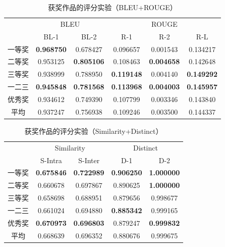 \begin{table}[ht]
  \centering
  \caption{获奖作品的评分实验（BLEU+ROUGE）}
  \label{tab:test_scoring_prized_dsr1_1}
  \begin{tabular}{cccccc}
      \toprule
      &  \multicolumn{2}{c}{BLEU} & \multicolumn{3}{c}{ROUGE}\\
      \cmidrule(r){2-3} \cmidrule(l){4-6}
       & BL-1& BL-2& R-1& R-2& R-L\\
      \midrule
      一等奖	&	\textbf{0.968750} 	&	0.678427 	&	0.096657 	&	0.001543 	&	0.134217 	\\
      二等奖	&	0.953125 	&	\textbf{0.805106} 	&	0.108463 	&	\textbf{0.004658} 	&	0.142648 	\\
      三等奖	&	0.938999 	&	0.788950 	&	\textbf{0.119148} 	&	0.004140 	&	\textbf{0.149292} 	\\
      \cmidrule{2-6} %
      一二三	&	\textbf{0.945848} 	&	\textbf{0.781568} 	&	\textbf{0.113968} 	&	\textbf{0.004003} 	&	\textbf{0.145957} 	\\
      优秀奖	&	0.934612 	&	0.749390 	&	0.107799 	&	0.003346 	&	0.143840 	\\
      \cmidrule{2-6} %
      平均	&	0.937247 	&	0.756938 	&	0.109246 	&	0.003500 	&	0.144337 	\\
      \bottomrule
  \end{tabular}
\end{table}

\begin{table}[ht]
  \centering
  \caption{获奖作品的评分实验（Similarity+Distinct）}
  \label{tab:test_scoring_prized_dsr1_2}
  \begin{tabular}{ccccc}
      \toprule
      & \multicolumn{2}{c}{Similarity} & \multicolumn{2}{c}{Distinct}\\
      \cmidrule(r){2-3} \cmidrule(l){4-5} 
      & S-Intra& S-Inter& D-1& D-2\\
      \midrule
      一等奖&	\bf{0.675846} 	&	\bf{0.722989} 	&	\bf{0.906250} 	&	\bf{1.000000} 	\\
      二等奖&	0.660678 	&	0.697867 	&	0.890625 	&	\bf{1.000000} \\
      三等奖&	0.658698 	&	0.688951 	&	0.879656 	&	0.998677 	\\
      \cmidrule{2-5} %
      一二三&	0.661024 	&	0.694880 	&	\bf{0.885342} 	&	0.999165 \\
      优秀奖&	\bf{0.670973} 	&	\bf{0.696803} 	&	0.879247 	&	\bf{0.999832} 	\\
      
      \cmidrule{2-5} %
      平均&	0.668639 	&	0.696352 	&	0.880676 	&	0.999675 	\\

      \bottomrule
  \end{tabular}
\end{table}


